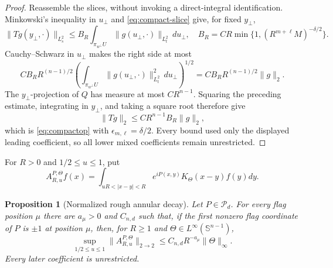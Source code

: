 \documentclass[11pt]{article}
\numberwithin{equation}{section}
\newtheorem{proposition}[theorem]{Proposition}
\theoremstyle{remark}
\theoremstyle{definition}
\newcommand{\Sph}{\mathbb S}
\newcommand{\norm}[1]{\lVert #1\rVert}
\begin{document}
\begin{proof}
Reassemble the slices, without invoking a direct-integral identification.
Minkowski's inequality in $u_\perp$ and \eqref{eq:compact-slice} give,
for fixed $y_\perp$,
\[
 \norm{Tg(y_\perp,\cdot)}_{L_s^2}
 \le B_R\int_{\pi_{w^\perp}U}
       \norm{g(u_\perp,\cdot)}_{L_t^2}\,du_\perp,
 \quad
 B_R=CR\min\{1,(R^{m+\ell}M)^{-\delta/2}\}.
\]
Cauchy--Schwarz in $u_\perp$ makes the right side at most
\[
 C B_R R^{(n-1)/2}
 \left(\int_{\pi_{w^\perp}U}
   \norm{g(u_\perp,\cdot)}_{L_t^2}^2\,du_\perp\right)^{1/2}
 =C B_RR^{(n-1)/2}\norm g_2.
\]
The $y_\perp$-projection of $Q$ has measure at most $CR^{n-1}$.
Squaring the preceding estimate, integrating in $y_\perp$, and taking a
square root therefore give
\[
 \norm{Tg}_2\le CR^{n-1}B_R\norm g_2,
\]
which is \eqref{eq:compactop} with
$\epsilon_{m,\ell}=\delta/2$.  Every bound used only the displayed
leading coefficient, so all lower mixed coefficients remain unrestricted.
\end{proof}

For $R>0$ and $1/2\le u\le1$, put
\begin{equation}\label{eq:partialannulus}
 A^{P,\Theta}_{R,u}f(x)=
 \int_{uR<|x-y|<R}e^{iP(x,y)}K_\Theta(x-y)f(y)dy.
\end{equation}

\begin{proposition}[Normalized rough annular decay]\label{prop:annulardecay}
Let $P\in\mathcal P_d$.  For every flag position $\mu$ there are
$a_\mu>0$ and $C_{n,d}$ such that,
if the first nonzero flag coordinate of $P$ is $\pm1$ at position $\mu$,
then, for $R\ge1$ and $\Theta\in L^\infty(\Sph^{n-1})$,
\begin{equation}\label{eq:annulardecay}
 \sup_{1/2\le u\le1}\norm{A^{P,\Theta}_{R,u}}_{2\to2}
 \le C_{n,d}R^{-a_\mu}\norm\Theta_\infty.
\end{equation}
Every later coefficient is unrestricted.
\end{proposition}
\end{document}
